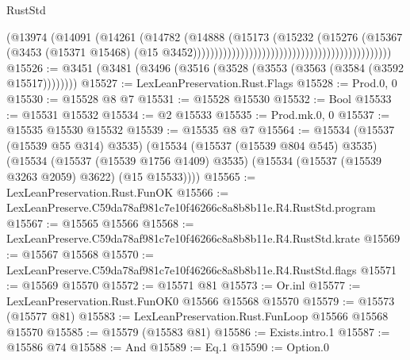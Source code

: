 \begin{lexlean}{RustStd}
\begin{coremodule}
                                                                          (@13974
                                                                            (@14091
                                                                              (@14261
                                                                                (@14782
                                                                                  (@14888
                                                                                    (@15173
                                                                                      (@15232
                                                                                        (@15276
                                                                                          (@15367
                                                                                            (@3453
                                                                                              (@15371
                                                                                                @15468)
                                                                                              (@15
                                                                                                @3452))))))))))))))))))))))))))))))))))))))))))))))
@15526 := @3451 (@3481 (@3496 (@3516 (@3528 (@3553 (@3563 (@3584 (@3592 @15517))))))))
@15527 := LexLeanPreservation.Rust.Flags
@15528 := Prod.{0, 0}
@15530 := @15528 @8 @7
@15531 := @15528 @15530
@15532 := Bool
@15533 := @15531 @15532
@15534 := @2 @15533
@15535 := Prod.mk.{0, 0}
@15537 := @15535 @15530 @15532
@15539 := @15535 @8 @7
@15564 := @15534
    (@15537 (@15539 @55 @314) @3535)
    (@15534
      (@15537 (@15539 @804 @545) @3535)
      (@15534
        (@15537 (@15539 @1756 @1409) @3535)
        (@15534 (@15537 (@15539 @3263 @2059) @3622) (@15 @15533))))
@15565 := LexLeanPreservation.Rust.FunOK
@15566 := LexLeanPreserve.C59da78af981c7e10f46266c8a8b8b11e.R4.RustStd.program
@15567 := @15565 @15566
@15568 := LexLeanPreserve.C59da78af981c7e10f46266c8a8b8b11e.R4.RustStd.krate
@15569 := @15567 @15568
@15570 := LexLeanPreserve.C59da78af981c7e10f46266c8a8b8b11e.R4.RustStd.flags
@15571 := @15569 @15570
@15572 := @15571 @81
@15573 := Or.inl
@15577 := LexLeanPreservation.Rust.FunOK0 @15566 @15568 @15570
@15579 := @15573 (@15577 @81)
@15583 := LexLeanPreservation.Rust.FunLoop @15566 @15568 @15570
@15585 := @15579 (@15583 @81)
@15586 := Exists.intro.{1}
@15587 := @15586 @74
@15588 := And
@15589 := Eq.{1}
@15590 := Option.{0}

\end{coremodule}
\end{lexlean}
